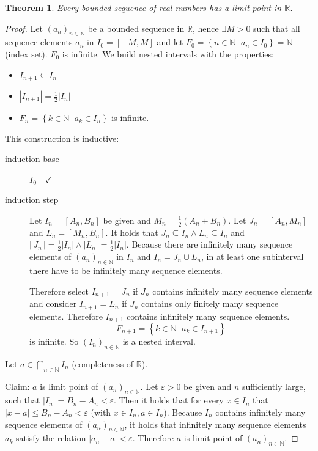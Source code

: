 \documentclass[a4paper,landscape,twocolumn]{article}
\newtheorem{theorem}{Theorem}
\newcommand\setdef[2]{\left\{#1\,|\,#2\right\}}
\newcommand\abs[1]{\left|#1\right|}
\newcommand\seq[1]{{\left(#1\right)}_{n \in \mathbb N}}
\newcommand\card[1]{\left|\,#1\,\right|}
\begin{document}
\begin{theorem}
  Every bounded sequence of real numbers has a limit point in $\mathbb R$.
\end{theorem}
\begin{proof}
  Let $\seq{a_n}$ be a bounded sequence in $\mathbb R$, hence $\exists M > 0$
  such that all sequence elements $a_n$ in $I_0 = [-M, M]$ and let
  $F_0 = \setdef{n \in \mathbb N}{a_n \in I_0} = \mathbb N$ (index set). $F_0$ is infinite.
  We build nested intervals with the properties:
  \begin{itemize}
    \item $I_{n+1} \subseteq I_n$
    \item $\abs{I_{n+1}} = \frac12 \abs{I_n}$
    \item $F_n = \setdef{k \in \mathbb N}{a_k \in I_n}$ is infinite.
  \end{itemize}

  This construction is inductive:
  \begin{description}
    \item[induction base] $I_0 \quad \checkmark$
    \item[induction step]
      Let $I_n = [A_n, B_n]$ be given and $M_n = \frac12(A_n + B_n)$.
      Let $J_n = [A_n, M_n]$ and $L_n = [M_n, B_n]$.
      It holds that $J_n \subseteq I_n \land L_n \subseteq I_n$
      and $\card{J_n} = \frac12 \abs{I_n} \land \abs{L_n} = \frac12 \abs{I_n}$.
      Because there are infinitely many sequence elements of $\seq{a_n}$ in $I_n$
      and $I_n = J_n \cup L_n$, in at least one subinterval there have to be
      infinitely many sequence elements.

      Therefore select $I_{n+1} = J_n$ if $J_n$ contains infinitely many sequence elements
      and consider $I_{n+1} = L_n$ if $J_n$ contains only finitely many sequence elements.
      Therefore $I_{n+1}$ contains infinitely many sequence elements.
      \[ F_{n+1} = \setdef{k \in \mathbb N}{a_k \in I_{n+1}} \]
      is infinite.
      So $(I_n)_{n \in \mathbb N}$ is a nested interval.
  \end{description}

  Let $a \in \bigcap_{n \in \mathbb N} I_n$ (completeness of $\mathbb R$).

  Claim:
  $a$ is limit point of $\seq{a_n}$. Let $\varepsilon > 0$ be given and $n$ sufficiently large,
  such that $\abs{I_n} = B_n - A_n < \varepsilon$.
  Then it holds that for every $x \in I_n$ that $\abs{x - a} \leq B_n - A_n < \varepsilon$ (with $x \in I_n, a \in I_n$).
  Because $I_n$ contains infinitely many sequence elements of $\seq{a_n}$, it holds that
  infinitely many sequence elements $a_k$ satisfy the relation $\abs{a_n - a} < \varepsilon$.
  Therefore $a$ is limit point of $\seq{a_n}$.
\end{proof}
\end{document}
